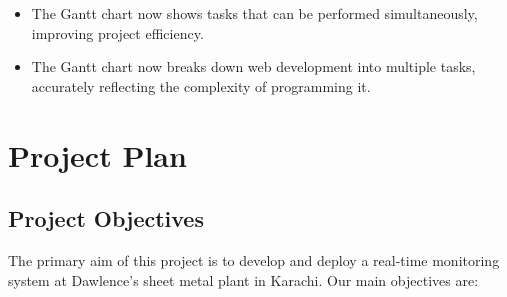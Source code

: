 \documentclass[12pt]{article}
\begin{document}
\begin{itemize}
    \item The Gantt chart now shows tasks that can be performed simultaneously, improving project efficiency.
    \item The Gantt chart now breaks down web development into multiple tasks, accurately reflecting the complexity of programming it.
\end{itemize}


\section{Project Plan}

\subsection*{Project Objectives}
The primary aim of this project is to develop and deploy a real-time monitoring system at Dawlence's sheet metal plant in Karachi. Our main objectives are:
\end{document}
